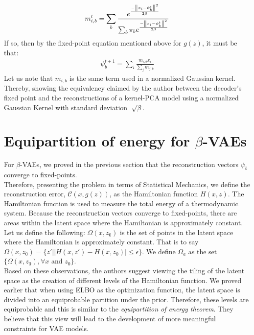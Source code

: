 \begin{gather*}
m_{i,b}^t = \sum_b\frac{e^\frac{-\left\lVert x_i - \psi_b^t\right\rVert^2}{2\beta}}{\sum_b \pi_be^\frac{-\left\lVert x_i-\psi_b^t\right\rVert^2}{2\beta}}
\end{gather*}
If so, then by the fixed-point equation mentioned above for $g(z)$, it must be that:
\begin{gather*}
\psi_b^{t+1} = \sum_i \frac{m_{i,b} x_i}{\sum_j m_{j,b}}
\end{gather*}
Let us note that $m_{i,b}$ is the same term used in a normalized Gaussian kernel. Thereby, showing the equivalency claimed by the author between the decoder's fixed point and the reconstructions of a kernel-PCA model using a normalized Gaussian Kernel with standard deviation $\sqrt[]{\beta}$.


\section*{Equipartition of energy for $\beta$-VAEs}

For $\beta$-VAEs, we proved in the previous section that the reconstruction vectors $\psi_b$ converge to fixed-points.\\
Therefore, presenting the problem in terms of Statistical Mechanics, we define the reconstruction error, $\mathcal{C}(x, g(z))$, as the Hamiltonian function $H(x,z)$. The Hamiltonian function is used to measure the total energy of a thermodynamic system. Because the reconstruction vectors converge to fixed-points, there are areas within the latent space where the Hamiltonian is approximately constant.\\
Let us define the following: $\Omega(x,z_0)$ is the set of points in the latent space where the Hamiltonian is approximately constant. That is to say $\Omega(x,z_0) = \{z'||H(x,z')-H(x,z_0)|\leq\epsilon\}$. We define $\Omega_a$ as the set $\{\Omega(x,z_0),\forall x$ and $z_0\}$.\\
Based on these observations, the authors suggest viewing the tiling of the latent space as the creation of different levels of the Hamiltonian function. We proved earlier that when using ELBO as the optimization function, the latent space is divided into an equiprobable partition under the prior. Therefore, these levels are equiprobable and this is similar to the \textit{equipartition of energy theorem}. They believe that this view will lead to the development of more meaningful constraints for VAE models.
